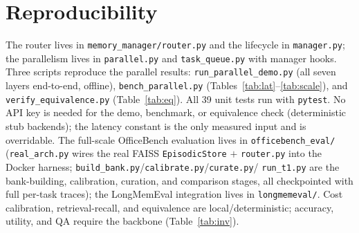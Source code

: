 \documentclass[10pt,twocolumn]{article}
\newcommand{\code}[1]{\texttt{\small #1}}
\begin{document}
\section{Reproducibility}
The router lives in \code{memory\_manager/router.py} and the lifecycle in
\code{manager.py}; the parallelism lives in \code{parallel.py} and
\code{task\_queue.py} with manager hooks. Three scripts reproduce the parallel
results: \code{run\_parallel\_demo.py} (all seven layers end-to-end, offline),
\code{bench\_parallel.py} (Tables~\ref{tab:lat}--\ref{tab:scale}), and
\code{verify\_equivalence.py} (Table~\ref{tab:eq}). All 39 unit tests run with
\code{pytest}. No API key is needed for the demo, benchmark, or equivalence check
(deterministic stub backends); the latency constant is the only measured input and
is overridable. The full-scale OfficeBench evaluation lives in \code{officebench\_eval/}
(\code{real\_arch.py} wires the real FAISS \code{EpisodicStore} $+$ \code{router.py}
into the Docker harness; \code{build\_bank.py}/\code{calibrate.py}/\code{curate.py}/
\code{run\_t1.py} are the bank-building, calibration, curation, and comparison stages, all checkpointed with full
per-task traces); the LongMemEval integration lives in \code{longmemeval/}. Cost
calibration, retrieval-recall, and equivalence are local/deterministic; accuracy,
utility, and QA require the backbone (Table~\ref{tab:inv}).

\end{document}
